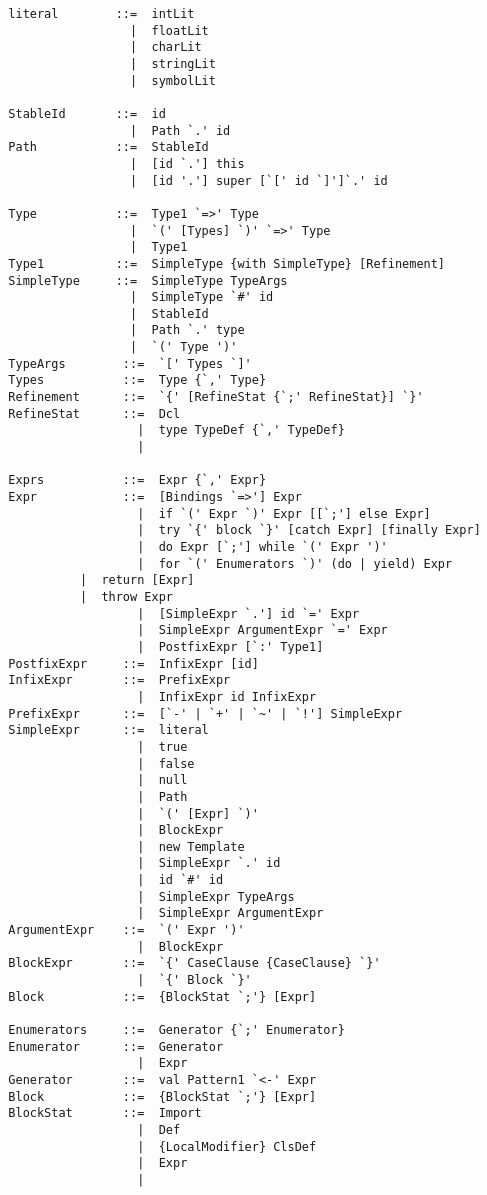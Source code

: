 \documentclass[a4paper,12pt,twoside,titlepage]{book}
\begin{document}
\begin{lstlisting}
  literal        ::=  intLit
                   |  floatLit
                   |  charLit
                   |  stringLit
                   |  symbolLit

  StableId       ::=  id
                   |  Path `.' id
  Path           ::=  StableId
                   |  [id `.'] this
                   |  [id '.'] super [`[' id `]']`.' id

  Type           ::=  Type1 `=>' Type
                   |  `(' [Types] `)' `=>' Type
                   |  Type1
  Type1          ::=  SimpleType {with SimpleType} [Refinement]
  SimpleType     ::=  SimpleType TypeArgs
                   |  SimpleType `#' id
                   |  StableId
                   |  Path `.' type
                   |  `(' Type ')'
  TypeArgs        ::=  `[' Types `]'
  Types           ::=  Type {`,' Type}
  Refinement      ::=  `{' [RefineStat {`;' RefineStat}] `}'
  RefineStat      ::=  Dcl
                    |  type TypeDef {`,' TypeDef}
                    |

  Exprs           ::=  Expr {`,' Expr}
  Expr            ::=  [Bindings `=>'] Expr
                    |  if `(' Expr `)' Expr [[`;'] else Expr]
                    |  try `{' block `}' [catch Expr] [finally Expr]
                    |  do Expr [`;'] while `(' Expr ')'
                    |  for `(' Enumerators `)' (do | yield) Expr
		    |  return [Expr]
		    |  throw Expr
                    |  [SimpleExpr `.'] id `=' Expr
                    |  SimpleExpr ArgumentExpr `=' Expr
                    |  PostfixExpr [`:' Type1]
  PostfixExpr     ::=  InfixExpr [id]
  InfixExpr       ::=  PrefixExpr
                    |  InfixExpr id InfixExpr
  PrefixExpr      ::=  [`-' | `+' | `~' | `!'] SimpleExpr 
  SimpleExpr      ::=  literal
                    |  true
                    |  false
                    |  null
                    |  Path
                    |  `(' [Expr] `)'
                    |  BlockExpr
                    |  new Template 
                    |  SimpleExpr `.' id 
                    |  id `#' id 
                    |  SimpleExpr TypeArgs
                    |  SimpleExpr ArgumentExpr
  ArgumentExpr    ::=  `(' Expr ')'
                    |  BlockExpr
  BlockExpr       ::=  `{' CaseClause {CaseClause} `}'
                    |  `{' Block `}'
  Block           ::=  {BlockStat `;'} [Expr]

  Enumerators     ::=  Generator {`;' Enumerator}
  Enumerator      ::=  Generator
                    |  Expr
  Generator       ::=  val Pattern1 `<-' Expr
  Block           ::=  {BlockStat `;'} [Expr]
  BlockStat       ::=  Import
                    |  Def
                    |  {LocalModifier} ClsDef
                    |  Expr
                    |


\end{lstlisting}
\end{document}
